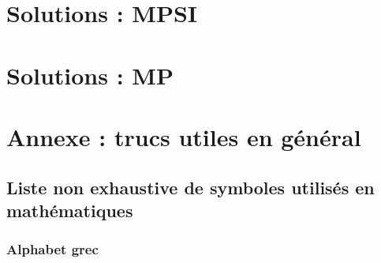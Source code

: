 \documentclass[12pt,a4paper]{exo_book}
\begin{document}
\part{Solutions : MPSI}


\part{Solutions : MP}

\appendix

\part{Annexe : trucs utiles en général}


\chapter{Liste non exhaustive de symboles utilisés en mathématiques}

\section{Alphabet grec}
\end{document}
